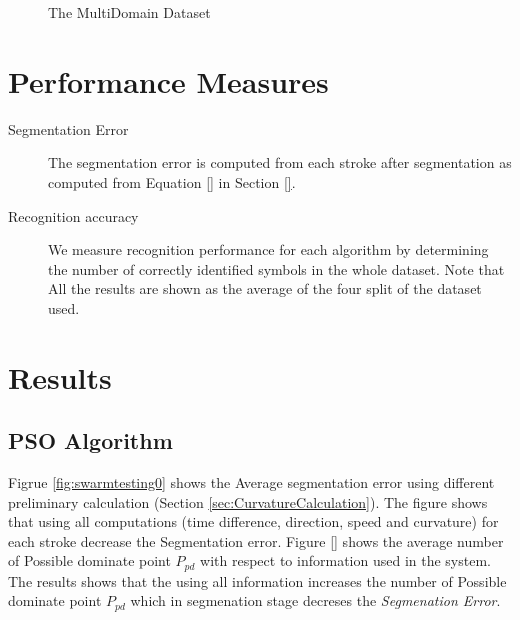\begin{figure}[]\centering
{}
	\caption{The MultiDomain Dataset }
	\label{fig:MultisymbolSet}
\end{figure}

\section{Performance Measures }
\label{sec:PerformanceMeasures}

\begin{description}
	\item[Segmentation Error] The segmentation error is computed from each stroke after segmentation as computed from Equation \ref{} in Section \ref{}. 
	\item [Recognition accuracy] We measure recognition performance for each algorithm by determining the number of correctly identified symbols in the whole dataset. Note that All the results are shown as the average of the four split of the dataset used. 
\end{description}

 

\section{Results}
\label{sec:ResultsDetails}

\subsection{PSO Algorithm}
\label{sec:PSO}

Figrue \ref{fig:swarmtesting0} shows the Average segmentation error using different preliminary calculation (Section \ref{sec:CurvatureCalculation}). The figure shows that using all computations (time difference, direction, speed and curvature) for each stroke decrease the Segmentation error. Figure \ref{} shows the average number of Possible dominate point $P_{pd}$ with respect to information used in the system. The results shows that the using all information increases the number of Possible dominate point $P_{pd}$ which in segmenation stage decreses the \textit{Segmenation Error}. 

